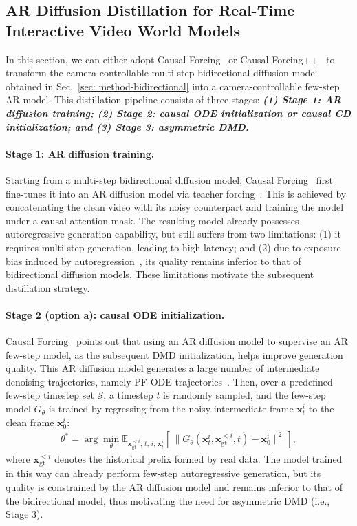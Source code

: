 \documentclass{llmxive}
\providecommand{\bm}[1]{\boldsymbol{#1}}
\providecommand{\vx}{{\bm{x}}}
\providecommand{\gS}{{\mathcal{S}}}
\begin{document}
\subsection{AR Diffusion Distillation for Real-Time Interactive Video World Models}
\label{sec: method-ar}

In this section, we can either adopt Causal Forcing~\cite{zhu2026causal} or Causal Forcing++~\cite{zhao2026causal} to transform the camera-controllable multi-step bidirectional diffusion model obtained in Sec.~\ref{sec: method-bidirectional} into a camera-controllable few-step AR model. This distillation pipeline consists of three stages: \emph{\textbf{(1) Stage 1: AR diffusion training; (2) Stage 2: causal ODE initialization or causal CD initialization; and (3) Stage 3: asymmetric DMD.}} 

\paragraph{Stage 1: AR diffusion training.} Starting from a multi-step bidirectional diffusion model, Causal Forcing~\cite{zhu2026causal} first fine-tunes it into an AR diffusion model via teacher forcing~\cite{teng2025magi}. This is achieved by concatenating the clean video with its noisy counterpart and training the model under a causal attention mask. The resulting model already possesses autoregressive generation capability, but still suffers from two limitations: (1) it requires multi-step generation, leading to high latency; and (2) due to exposure bias induced by autoregression~\cite{yin2025slow}, its quality remains inferior to that of bidirectional diffusion models. These limitations motivate the subsequent distillation strategy.



\paragraph{Stage 2 (option a): causal ODE initialization.} Causal Forcing~\cite{zhu2026causal} points out that using an AR diffusion model to supervise an AR few-step model, as the subsequent DMD initialization, helps improve generation quality. This AR diffusion model generates a large number of intermediate denoising trajectories, namely PF-ODE trajectories~\cite{song2020score}. Then, over a predefined few-step timestep set $\gS$, a timestep $t$ is randomly sampled, and the few-step model $G_\theta$ is trained by regressing from the noisy intermediate frame $\vx_t^i$ to the clean frame $\vx_0^i$:
\begin{align}
    \theta^*=\arg\min_\theta \mathbb{E}_{\vx_{\mathrm{gt}}^{<i},\, t,\, i,\, \vx_t^i}\left[\,\|G_\theta(\vx_t^i,\vx_{\mathrm{gt}}^{<i}, t)-\vx_0^i\|^2\,\right],
\end{align}
where $\vx_{\mathrm{gt}}^{<i}$ denotes the historical prefix formed by real data. The model trained in this way can already perform few-step autoregressive generation, but its quality is constrained by the AR diffusion model and remains inferior to that of the bidirectional model, thus motivating the need for asymmetric DMD (i.e., Stage 3).
\end{document}
